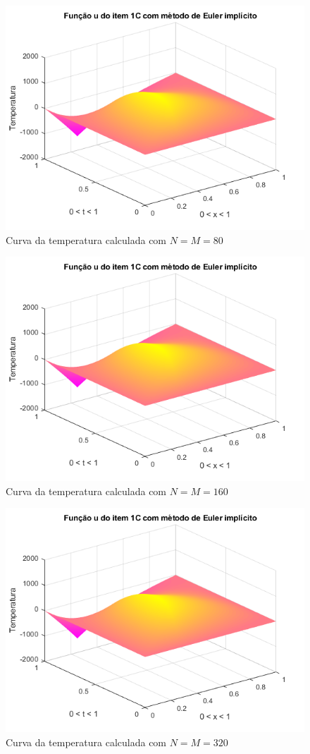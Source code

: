 \documentclass[12pt]{article}
\begin{document}
\begin{spacing}{1.5}
\begin{figure}
    \centering
    \includegraphics[width=0.8\linewidth]{Segunda_Tarefa/ItemB/nm80_calculada_C.png}
    \caption{Curva da temperatura calculada com $N=M=80$}
    \label{fig:BC_nm80_calculada}
\end{figure}

\begin{figure}
    \centering
    \includegraphics[width=0.8\linewidth]{Segunda_Tarefa/ItemB/nm160_calculada_C.png}
    \caption{Curva da temperatura calculada com $N=M=160$}
    \label{fig:BC_nm160_calculada}
\end{figure}

\begin{figure}
    \centering
    \includegraphics[width=0.8\linewidth]{Segunda_Tarefa/ItemB/nm320_calculada_C.png}
    \caption{Curva da temperatura calculada com $N=M=320$}
    \label{fig:BC_nm320_calculada}
\end{figure}



\end{spacing}
\end{document}
